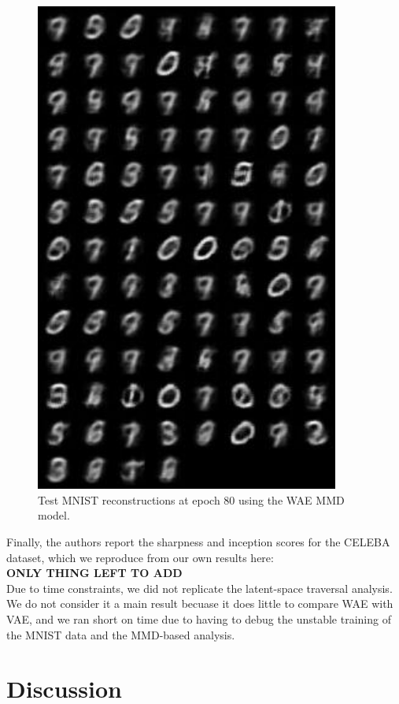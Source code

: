 \documentclass[12pt,english]{amsart}
\theoremstyle{definition}
\begin{document}
\begin{figure}[h]
\includegraphics[width=100mm]{mnist_wae-mmd_ep_79_recon}
\caption{Test MNIST reconstructions at epoch 80 using the WAE MMD model.}
\label{Figure 7}
\end{figure}


Finally, the authors report the sharpness and inception scores for the CELEBA
dataset, which we reproduce from our own results here: \\

\textbf{ONLY THING LEFT TO ADD}\\

Due to time constraints, we did not replicate the latent-space traversal
analysis. We do not consider it a main result becuase it does little to compare
WAE with VAE, and we ran short on time due to having to debug the unstable
training of the MNIST data and the MMD-based analysis.


\section{Discussion}
\end{document}
